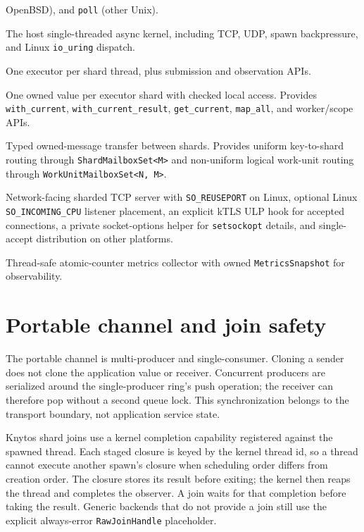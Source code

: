 \begin{description}
        OpenBSD), and \texttt{poll} (other Unix).
    \item[\texttt{executor}] The host single-threaded async kernel, including
        TCP, UDP, spawn backpressure, and Linux \texttt{io\_uring} dispatch.
    \item[\texttt{sharded\_executor}] One executor per shard thread, plus
        submission and observation APIs.
    \item[\texttt{shard\_local}] One owned value per executor shard with
        checked local access. Provides \texttt{with\_current},
        \texttt{with\_current\_result}, \texttt{get\_current},
        \texttt{map\_all}, and worker/scope APIs.
    \item[\texttt{shard\_mailbox}] Typed owned-message transfer between
        shards. Provides uniform key-to-shard routing through
        \texttt{ShardMailboxSet<M>} and non-uniform logical work-unit routing
        through \texttt{WorkUnitMailboxSet<N, M>}.
    \item[\texttt{sharded\_tcp}] Network-facing sharded TCP server with
        \texttt{SO\_REUSEPORT} on Linux, optional Linux
        \texttt{SO\_INCOMING\_CPU} listener placement, an explicit kTLS ULP
        hook for accepted connections, a private socket-options helper for
        \texttt{setsockopt} details, and single-accept distribution on other
        platforms.
    \item[\texttt{metrics}] Thread-safe atomic-counter metrics collector with
        owned \texttt{MetricsSnapshot} for observability.
\end{description}

\section{Portable channel and join safety}

The portable channel is multi-producer and single-consumer. Cloning a sender
does not clone the application value or receiver. Concurrent producers are
serialized around the single-producer ring's push operation; the receiver can
therefore pop without a second queue lock. This synchronization belongs to the
transport boundary, not application service state.

Knytos shard joins use a kernel completion capability registered against
the spawned thread. Each staged closure is keyed by the kernel thread id, so a
thread cannot execute another spawn's closure when scheduling order differs
from creation order. The closure stores its result before exiting; the kernel
then reaps the thread and completes the observer. A join waits for that
completion before taking the result. Generic backends that do not provide a
join still use the explicit always-error \texttt{RawJoinHandle} placeholder.


